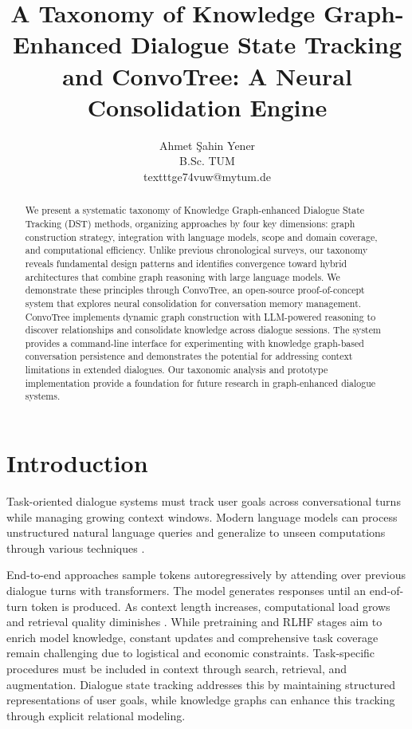 \documentclass[11pt]{article}
\title{A Taxonomy of Knowledge Graph-Enhanced Dialogue State Tracking and ConvoTree: A Neural Consolidation Engine}
\author{Ahmet Şahin Yener \\
  B.Sc. TUM \\texttt{ge74vuw@mytum.de}}
\begin{document}
\maketitle

\begin{abstract}
We present a systematic taxonomy of Knowledge Graph-enhanced Dialogue State Tracking (DST) methods, organizing approaches by four key dimensions: graph construction strategy, integration with language models, scope and domain coverage, and computational efficiency. Unlike previous chronological surveys, our taxonomy reveals fundamental design patterns and identifies convergence toward hybrid architectures that combine graph reasoning with large language models. We demonstrate these principles through ConvoTree, an open-source proof-of-concept system that explores neural consolidation for conversation memory management. ConvoTree implements dynamic graph construction with LLM-powered reasoning to discover relationships and consolidate knowledge across dialogue sessions. The system provides a command-line interface for experimenting with knowledge graph-based conversation persistence and demonstrates the potential for addressing context limitations in extended dialogues. Our taxonomic analysis and prototype implementation provide a foundation for future research in graph-enhanced dialogue systems.
\end{abstract}

\section{Introduction}

Task-oriented dialogue systems must track user goals across conversational turns while managing growing context windows. Modern language models can process unstructured natural language queries and generalize to unseen computations through various techniques \citep{dong2022survey,wei2023chainofthoughtpromptingelicitsreasoning,bai2022training}.

End-to-end approaches sample tokens autoregressively by attending over previous dialogue turns with transformers. The model generates responses until an end-of-turn token is produced. As context length increases, computational load grows and retrieval quality diminishes \citep{nelson2024needle,hong2025context}.   
While pretraining and RLHF stages aim to enrich model knowledge, constant updates and comprehensive task coverage remain challenging due to logistical and economic constraints. Task-specific procedures must be included in context through search, retrieval, and augmentation. Dialogue state tracking addresses this by maintaining structured representations of user goals, while knowledge graphs can enhance this tracking through explicit relational modeling.
\end{document}
